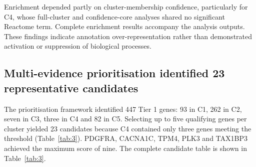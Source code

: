 \documentclass[11pt,a4paper]{article}
\begin{document}
Enrichment depended partly on cluster-membership confidence, particularly for C4, whose full-cluster and confidence-core analyses shared no significant Reactome term. Complete enrichment results accompany the analysis outputs. These findings indicate annotation over-representation rather than demonstrated activation or suppression of biological processes.






\subsection*{Multi-evidence prioritisation identified 23 representative candidates}

The prioritisation framework identified 447 Tier 1 genes: 93 in C1, 262 in C2, seven in C3, three in C4 and 82 in C5. Selecting up to five qualifying genes per cluster yielded 23 candidates because C4 contained only three genes meeting the threshold (Table~\ref{tab:3}). PDGFRA, CACNA1C, TPM4, PLK3 and TAX1BP3 achieved the maximum score of nine. The complete candidate table is shown in Table~\ref{tab:3}.
\end{document}
